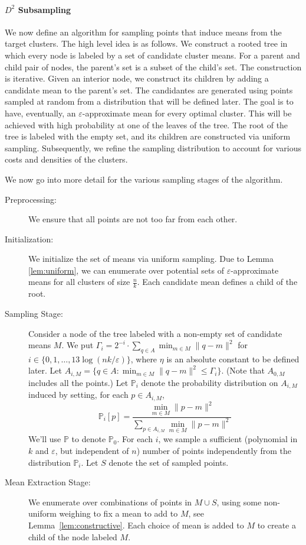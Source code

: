 \documentclass[10pt,a4paper]{amsart}
\begin{document}
\paragraph{$D^2$ Subsampling}
We now define an algorithm for sampling points that induce means from the target clusters.
The high level idea is as follows. We construct a rooted tree in which every node is labeled by a set of candidate cluster means. For a parent and child pair of nodes, the parent's set is a subset of the child's set. The construction is iterative. Given an interior node, we construct its children by adding a candidate mean to the parent's set. The candidantes are generated using points sampled at random from a distribution that will be defined later. The goal is to have, eventually, an $\varepsilon$-approximate mean for every optimal cluster. This will be achieved with high probability at one of the leaves of the tree. The root of the tree is labeled with the empty set, and its children are constructed via uniform sampling. Subsequently, we refine the sampling distribution to account for various costs and densities of the clusters.

We now go into more detail for the various sampling stages of the algorithm.

\begin{description}
    \item[Preprocessing:] We ensure that all points are not too far from each other.
    \item[Initialization:] We initialize the set of means via uniform sampling. Due to Lemma \ref{lem:uniform}, we can enumerate over potential sets of $\varepsilon$-approximate means for all clusters of size $\frac n k$. Each candidate mean defines a child of the root.
    \item[Sampling Stage:] Consider a node of the tree labeled with a non-empty set of candidate means $M$. We put 
    $\Gamma_i = 2^{-i}\cdot\sum_{q\in A}\min_{m\in M}\|q-m\|^2$ for $i\in \{0,1,\ldots,13\log ( nk / \varepsilon)\}$, where $\eta$ is an absolute constant to be defined later. Let $A_{i,M} = \{q\in A\colon \min_{m\in M}\|q-m\|^2\le \Gamma_i\}$. (Note that $A_{0,M}$ includes all the points.)
    Let $\mathbb{P}_i$ denote the probability distribution on $A_{i,M}$ induced by setting, for each $p\in A_{i,M}$, 
    $$
    \mathbb{P}_i[p]=\frac{\min_{m\in M}\|p-m\|^2}{\sum_{p\in A_{i,M}}\min_{m\in M}\|p-m\|^2}
    $$ 
    We'll use $\mathbb{P}$ to denote $\mathbb{P}_0$.
    For each $i$, we sample a sufficient (polynomial in $k$ and $\varepsilon$, but independent of $n$) number of points independently from the distribution $\mathbb{P}_i$. Let $S$ denote the set of sampled points.
    \item[Mean Extraction Stage:] We enumerate over combinations of points in $M\cup S$, using some non-uniform weighing to fix a mean to add to $M$, see Lemma~\ref{lem:constructive}. Each choice of mean is added to $M$ to create a child of the node labeled $M$.
\end{description}
\end{document}

